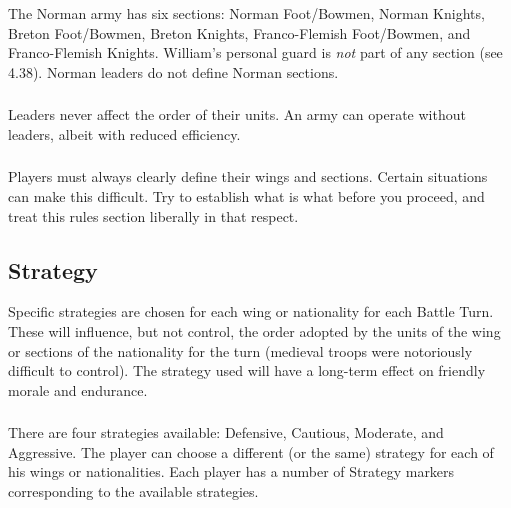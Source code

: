 \subsubsection[Norman Sections]{}

The Norman army has six sections: Norman Foot/Bowmen, Norman Knights, Breton Foot/Bowmen, Breton Knights, Franco-Flemish Foot/Bowmen, and Franco-Flemish Knights. William's personal guard is \textit{not} part of any section (see 4.38). Norman leaders do not define Norman sections.

\subsubsection[Leaders and Unit Orders]{}

Leaders never affect the order of their units. An army can operate without leaders, albeit with reduced efficiency.

\subsubsection[Define Wings and Sections]{}

Players must always clearly define their wings and sections. Certain situations can make this difficult. Try to establish what is what before you proceed, and treat this rules section liberally in that respect.

\subsection{Strategy}

Specific strategies are chosen for each wing or nationality for each Battle Turn. These will influence, but not control, the order adopted by the units of the wing or sections of the nationality for the turn (medieval troops were notoriously difficult to control). The strategy used will have a long-term effect on friendly morale and endurance.

\subsubsection[Strategies]{}

There are four strategies available: Defensive, Cautious, Moderate, and Aggressive. The player can choose a different (or the same) strategy for each of his wings or nationalities. Each player has a number of Strategy markers corresponding to the available strategies.

